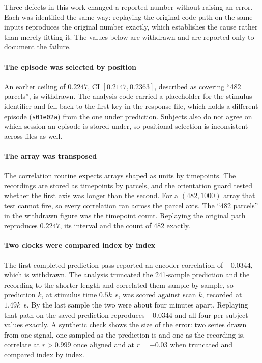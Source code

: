 \documentclass[preprint,12pt]{elsarticle}
\begin{document}
Three defects in this work changed a reported number without raising an error. Each was
identified the same way: replaying the original code path on the same inputs reproduces the
original number exactly, which establishes the cause rather than merely fitting it. The values
below are withdrawn and are reported only to document the failure.

\paragraph{The episode was selected by position} An earlier ceiling of $0.2247$, CI
$[0.2147, 0.2363]$, described as covering ``482 parcels'', is withdrawn. The analysis code
carried a placeholder for the stimulus identifier and fell back to the first key in the
response file, which holds a different episode (\texttt{s01e02a}) from the one under
prediction. Subjects also do not agree on which session an episode is stored under, so
positional selection is inconsistent across files as well.

\paragraph{The array was transposed} The correlation routine expects arrays shaped as
units by timepoints. The recordings are stored as timepoints by parcels, and the orientation
guard tested whether the first axis
was longer than the second. For a $(482, 1000)$ array that test cannot fire, so every
correlation ran across the parcel axis. The ``482 parcels'' in the withdrawn figure was the
timepoint count. Replaying the original path reproduces $0.2247$, its interval and the count of
482 exactly.

\paragraph{Two clocks were compared index by index} The first completed prediction pass
reported an encoder correlation of $+0.0344$, which is withdrawn. The analysis truncated the
241-sample prediction and the recording to the shorter length and correlated them sample by
sample, so prediction $k$, at stimulus time $0.5k$~s, was scored against scan $k$, recorded at
$1.49k$~s. By the last sample the two were about four minutes apart. Replaying that path on the
saved prediction reproduces $+0.0344$ and all four per-subject values exactly. A synthetic
check shows the size of the error: two series drawn from one signal, one sampled as the
prediction is and one as the recording is, correlate at $r > 0.999$ once aligned and at
$r = -0.03$ when truncated and compared index by index.
\end{document}
